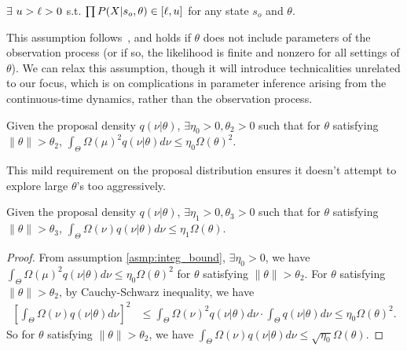 \begin{assumption}
$\exists$ $ u > \ell > 0$ s.t.
$\prod P(X | s_o, \theta) \in [\ell, u]$ for any state $s_o$ and $\theta$.%
  \label{asmp:obs_bnd}
\end{assumption}
\noindent This assumption follows~\cite{miasojedow2017}, and holds if
$\theta$ does not include parameters of the observation process (or if so,
the likelihood is finite and nonzero for all settings of $\theta$). We can relax this assumption,
though it will introduce technicalities unrelated to our focus, which 
is on complications in parameter inference arising from the continuous-time
dynamics, rather than the observation process. 

\begin{assumption}
Given the proposal density $q(\nu | \theta)$, $\exists \eta_0 > 0, \theta_2 > 0$ 
such that for $\theta$ satisfying $\| \theta \|  > \theta_2$, 
$ \int_\Theta \Omega(\mu)^2 q(\nu | \theta)d\nu \leq \eta_0 \Omega(\theta)^2.$
\label{asmp:integ_bound}
\end{assumption}
\noindent This mild requirement on the proposal distribution ensures it 
doesn't attempt
to explore large $\theta$'s too aggressively.
\begin{corollary}
Given the proposal density $q(\nu | \theta)$, $\exists \eta_1 > 0, \theta_3 > 0$ such that for $\theta$ 
satisfying $\| \theta \|  > \theta_3$, 
$ \int_\Theta \Omega(\nu) q(\nu | \theta)d\nu \leq \eta_1 \Omega(\theta).$
\label{corol:integ_bound}
\end{corollary}
\begin{proof}
From assumption \ref{asmp:integ_bound},  $\exists \eta_0 > 0$, we have $ \int_\Theta \Omega(\mu)^2 q(\nu | \theta)d\nu \leq \eta_0 \Omega(\theta)^2$ for $\theta$ satisfying $\| \theta \|  > \theta_2$.
For $\theta$ satisfying $\| \theta \|  > \theta_2$, by Cauchy-Schwarz inequality, we have
\begin{align*}
\left[ \int_\Theta \Omega(\nu) q(\nu | \theta) d\nu \right]^2 &\le \int_\Theta \Omega(\nu)^2 q(\nu | \theta) d\nu \cdot \int_\Theta q(\nu | \theta) d\nu \le \eta_0 \Omega(\theta)^2.
\end{align*}
So for $\theta$ satisfying $\| \theta \|  > \theta_2$, we have $\int_\Theta \Omega(\nu) q(\nu | \theta) d\nu \le \sqrt{\eta_0} \Omega(\theta).$
\end{proof}

